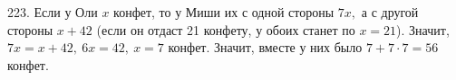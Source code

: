 223. Если у Оли $x$ конфет, то у Миши их с одной стороны $7x,$ а с другой стороны $x+42$ (если он отдаст 21 конфету, у обоих станет по $x=21$). Значит, $7x=x+42,\ 6x=42,\ x=7$ конфет. Значит, вместе у них было $7+7\cdot7=56$ конфет.\\
